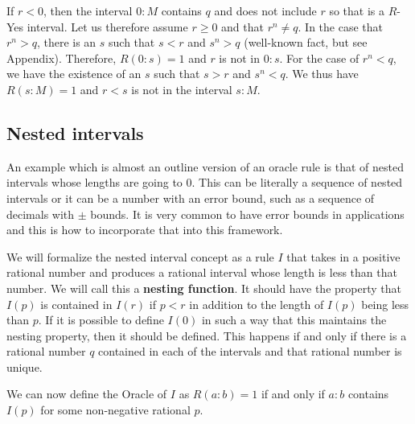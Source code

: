 \documentclass[12pt]{article}
\theoremstyle{remark}
\begin{document}
\begin{enumerate}
    If $r < 0$, then the interval $0:M$ contains $q$ and does not include $r$ so that is a $R$-Yes interval. Let us therefore assume $r \geq 0$ and that $r^n \neq q$. In the case that $r^n > q$, there is an $s$ such that $s<r$ and $s^n > q$ (well-known fact, but see Appendix). Therefore, $R(0:s) = 1$ and $r$ is not in $0:s$. For the case of $r^n < q$, we have the existence of an $s$ such that $s > r$ and $s^n < q$. We thus have $R(s:M)=1$ and $r < s$ is not in the interval $s:M$. 
    
\end{enumerate}

\subsection{Nested intervals}

An example which is almost an outline version of an oracle rule is that of nested intervals whose lengths are going to 0. This can be literally a sequence of nested intervals or it can be a number with an error bound, such as a sequence of decimals with $\pm$ bounds. It is very common to have error bounds in applications and this is how to incorporate that into this framework. 

We will formalize the nested interval concept as a rule $I$ that takes in a positive rational number and produces a rational interval whose length is less than that number. We will call this a \textbf{nesting function}. It should have the property that $I(p)$ is contained in $I(r)$ if $p<r$ in addition to the length of $I(p)$ being less than $p$. If it is possible to define $I(0)$ in such a way that this maintains the nesting property, then it should be defined. This happens if and only if there is a rational number $q$ contained in each of the intervals and that rational number is unique. 

We can now define the Oracle of $I$ as $R(a:b) = 1$ if and only if $a:b$ contains $I(p)$ for some non-negative rational $p$.
\end{document}
